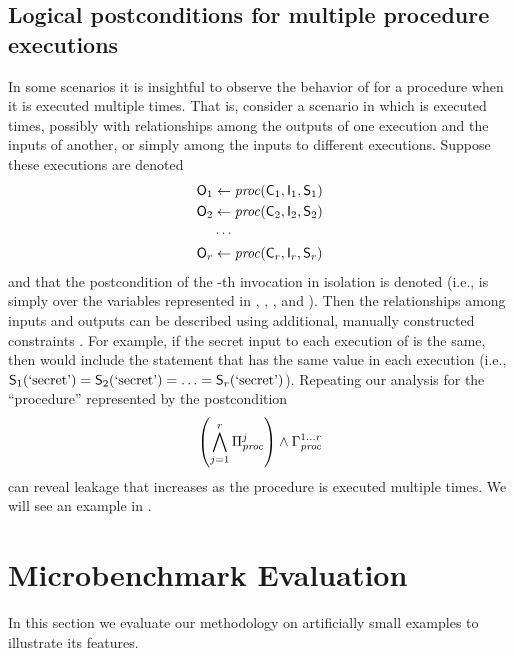 \subsection{Logical postconditions for multiple procedure executions}
\label{sscf:sec:impl:multiround}
In some scenarios it is insightful to observe the behavior of
\Jaccard{\secretsSetSize} for a procedure \proc when it is executed multiple times.
That is, consider a scenario in which \proc is executed \roundNmbr
times, possibly with relationships among the outputs of one execution
and the inputs of another, or simply among the inputs to different
executions.  Suppose these executions are denoted
\begin{align*}
  \mathsf{O}_{1} & \gets \mathit{proc}(\mathsf{C}_{1}, \mathsf{I}_{1}, \mathsf{S}_{1}) \\
  \mathsf{O}_{2} & \gets \mathit{proc}(\mathsf{C}_{2}, \mathsf{I}_{2}, \mathsf{S}_{2}) \\
         & \cdots \\
  \mathsf{O}_{r} & \gets \mathit{proc}(\mathsf{C}_{r}, \mathsf{I}_{r}, \mathsf{S}_{r})
\end{align*}
and that the postcondition of the \roundIdx-th invocation in isolation
is denoted \postcondition{\proc}{\roundIdx} (i.e.,
\postcondition{\proc}{\roundIdx} is simply \postcondition{\proc}{}
over the variables represented in \ACIFn{\roundIdx},
\AIIFn{\roundIdx}, \SecFn{\roundIdx}, and \AOOFn{\roundIdx}).  Then
the relationships among inputs and outputs can be described using
additional, manually constructed constraints
\glueConstraints{\proc}{1\ldots\roundNmbr}.  For example, if the
secret input to each execution of \proc is the same, then
\glueConstraints{\proc}{1\ldots\roundNmbr} would include the statement
that \secretVar has the same value in each execution (i.e.,
$\mathsf{S}_{1}(\textrm{`secret'}) = \mathsf{S}_{2}(\textrm{`secret'}) = \ldots =
\mathsf{S}_{r}(\textrm{`secret'})$).  Repeating our analysis for the
  ``procedure'' represented by the postcondition
\[
\left(\bigwedge_{j=1}^{r} \Pi_{\mathit{proc}}^{j} \right)
\wedge \Gamma_{\mathit{proc}}^{1\ldots r}
\]
can reveal leakage that increases as the procedure is executed
multiple times.  We will see an example in .

\section{Microbenchmark Evaluation}
\label{sscf:sec:micro}

In this section we evaluate our methodology on artificially small
examples to illustrate its features.

